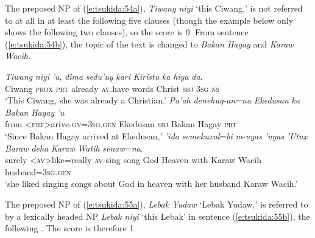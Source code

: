 \documentclass[output=paper
,modfonts
,nonflat]{langsci/langscibook}
\begin{document}
The preposed NP of (\ref{e:tsukida:54a}), \textit{Tiwang niyi} ‘this Ciwang,’ is not referred to at all in at least the following five clauses (though the example below only shows the following two clauses), so the score is 0. From sentence (\ref{e:tsukida:54b}), the topic of the text is changed to \textit{Bakan Hagay} and \textit{Karaw Wacih}.

\begin{exe}
	\label{e:tsukida:54}
	\begin{xlist}
		\ex\label{e:tsukida:54a}
		\gll \textit{Tiwang}   \textit{niyi}  \textit{'u}, \textit{dima} \textit{sedu'uy} \textit{kari} \textit{Kiristu} \textit{ka} \textit{hiya} \textit{da}.\\
		Ciwang \textsc{prox} \textsc{prt} already \textsc{av}.have words Christ \textsc{sbj} \textsc{3sg} \textsc{ns}\\
		\glt ‘This Ciwang, she was already a Christian.’
		\ex\label{e:tsukida:54b}
		\gll \textit{Pa'ah} \textit{d}{\USSmaller}\textit{en}{\USGreater}\textit{ehuq}-\textit{an}=\textit{na} \textit{Ekedusan} \textit{ka} \textit{Bakan} \textit{Hagay} \textit{'u}\\
		from <\textsc{prf}>arive-\textsc{gv}=\textsc{3sg}.\textsc{gen} Ekedusan \textsc{sbj} Bakan Hagay \textsc{prt}\\
		\glt ‘Since Bakan Hagay arrived at Ekedusan,’
		\ex\label{e:tsukida:54c}
		\gll \textit{'ida} \textit{s}{\USSmaller}\textit{em}{\USGreater}\textit{ekuxul}=\textit{bi} \textit{m}-\textit{uyas} \textit{'uyas} \textit{'Utux} \textit{Baraw} \textit{deha}     \textit{Karaw} \textit{Watih} \textit{senaw}=\textit{na}.\\
		surely <\textsc{av}>like=really \textsc{av}-sing song  God   Heaven  with Karaw  Wacih husband=\textsc{3sg}.\textsc{gen}\\
		\glt ‘she liked singing songs about God in heaven with her husband Karaw Wacih.’
	\end{xlist}
\end{exe}

\noindent
The preposed NP of (\ref{e:tsukida:55a}), \textit{Lebak Yudaw} ‘Lebak Yudaw,’ is referred to by a lexically headed NP \textit{Lebak niyi} ‘this Lebak’ in sentence (\ref{e:tsukida:55b}), the following . The score is therefore 1.
\end{document}
